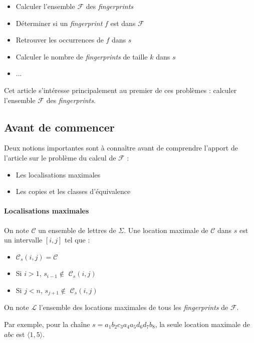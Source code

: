 \documentclass[a4paper]{article}
\begin{document}
\begin{itemize}
	\item Calculer l'ensemble $\mathcal{F}$ des \emph{fingerprints}
	\item Déterminer si un \emph{fingerprint} $f$ est dans $\mathcal{F}$
	\item Retrouver les occurrences de $f$ dans $s$
	\item Calculer le nombre de \emph{fingerprints} de taille $k$ dans $s$
	\item ...
\end{itemize}

Cet article s'intéresse principalement au premier de ces problèmes : calculer l'ensemble $\mathcal{F}$ des \emph{fingerprints}.

\subsection{Avant de commencer}

Deux notions importantes sont à connaître avant de comprendre l'apport de l'article sur le problème du calcul de $\mathcal{F}$ :

\begin{itemize}
	\item Les localisations maximales
	\item Les copies et les classes d'équivalence
\end{itemize}

\paragraph{Localisations maximales} On note $\mathcal{C}$ un ensemble
de lettres de $\Sigma$. Une location maximale de $\mathcal{C}$ dans
$s$ est un intervalle $[i,j]$ tel que : \newline
		
\begin{itemize}
	\item $\mathcal{C}_{s}(i,j) = \mathcal{C}$
	\item Si $i > 1$, $s_{i-1} \notin$ $\mathcal{C}_{s}(i,j)$
	\item Si $j < n$, $s_{j+1} \notin$ $\mathcal{C}_{s}(i,j)$
\end{itemize}

On note $\mathcal{L}$ l'ensemble des locations maximales de tous les \textit{fingerprints} de $\mathcal{F}$. \newline

Par exemple, pour la chaîne $s = a_{1} b_{2} c_{3} a_{4} a_{5} d_{6} d_{7} b_{8}$, la seule location maximale de $abc$ est $\langle1,5\rangle$.
\end{document}

